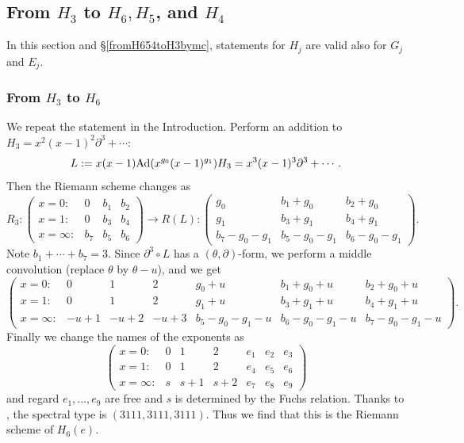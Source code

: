 \documentclass[a4paper,12pt]{article}
\theoremstyle{definition}
\theoremstyle{remark}
\numberwithin{equation}{section} %
\begin{document}
\subsection{From $H_3$ to $H_6,H_5$,  and $ H_4$}\label{fromH3toH654bymc}
In this section and \S \ref{fromH654toH3bymc}, statements for $H_j$ are valid also for $G_j$ and $E_j$.
\subsubsection{From $H_3$ to $H_6$}\label{fromH3toH6}
We repeat the statement in the Introduction. Perform an addition to $H_3=x^2(x-1)^2\partial^3+\cdots$: 
$$L:=x(x-1){\rm Ad}(x^{g_0}(x-1)^{g_1})H_3=x^3(x-1)^3\partial^3+\cdots.$$
Then the Riemann scheme changes as 
$$
R_3:  \begin{pmatrix}
  x=0:&0&b_1&b_2\\
  x=1:&0&b_3&b_4\\
  x=\infty:&b_7&b_5&b_6
 \end{pmatrix}
 \to
R(L): \begin{pmatrix}
  g_0&b_1+g_0&b_2+g_0\\
  g_1&b_3+g_1&b_4+g_1\\
 b_7-g_0-g_1&b_5-g_0-g_1&b_6-g_0-g_1
 \end{pmatrix}.$$
Note $b_1+\cdots+b_7=3.$ 
  Since $\partial^3\circ L$ has a $(\theta,\partial)$-form,
  we perform a middle convolution (replace $\theta$ by $\theta-u$), and we get
  $$\begin{pmatrix}
x=0:&0&1&2&g_0+u&b_1+g_0+u&b_2+g_0+u\\
x=1:&0&1&2&g_1+u&b_3+g_1+u&b_4+g_1+u\\
x=\infty:&-u+1&-u+2&-u+3&b_5-g_0-g_1-u&b_6-g_0-g_1-u&b_7-g_0-g_1-u
  \end{pmatrix}.$$
  Finally we change the names of the exponents as
 $$\begin{pmatrix}
   x=0:&0&1&2&e_1&e_2&e_3\\
   x=1:&0&1&2&e_4&e_5&e_6\\
   x=\infty:&s&s+1&s+2&e_7&e_8&e_9
  \end{pmatrix}$$
  and regard $e_1,\dots,e_9$ are free and $s$ is determined
  by the Fuchs relation. 
Thanks to \cite[Theorem 5.2]{Osh}, 
the spectral type is $(3111,3111,3111)$. Thus we find that this is the Riemann scheme of $H_6(e)$.
  
\end{document}

